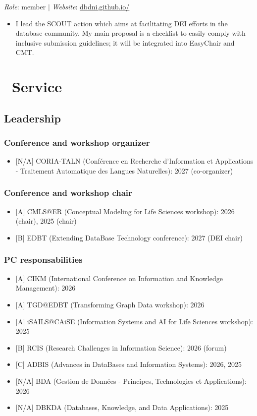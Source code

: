 \documentclass{article}
\begin{document}
\noindent\textit{Role}: member $|$ \textit{Website}: \href{https://dbdni.github.io/}{dbdni.github.io/}

\begin{itemize}
\item I lead the SCOUT action which aims at facilitating DEI efforts in the database community. My main proposal is a checklist to easily comply with inclusive submission guidelines; it will be integrated into EasyChair and CMT.
\end{itemize}
\section*{\faGroup\ Service}
\subsection*{Leadership}
\subsubsection*{Conference and workshop organizer}
\begin{itemize}
\item $[$N/A$]$ CORIA-TALN (Conférence en Recherche d'Information et Applications - Traitement Automatique des Langues Naturelles): 2027 (co-organizer)
\end{itemize}
\subsubsection*{Conference and workshop chair}
\begin{itemize}
\item $[$A$]$ CMLS@ER (Conceptual Modeling for Life Sciences workshop): 2026 (chair), 2025 (chair)
\item $[$B$]$ EDBT (Extending DataBase Technology conference): 2027 (DEI chair)
\end{itemize}
\subsubsection*{PC responsabilities}
\begin{itemize}
\item $[$A$]$ CIKM (International Conference on Information and Knowledge Management): 2026
\item $[$A$]$ TGD@EDBT (Transforming Graph Data workshop): 2026
\item $[$A$]$ iSAILS@CAiSE (Information Systems and AI for Life Sciences workshop): 2025
\item $[$B$]$ RCIS (Research Challenges in Information Science): 2026 (forum)
\item $[$C$]$ ADBIS (Advances in DataBases and Information Systems): 2026, 2025
\item $[$N/A$]$ BDA (Gestion de Données - Principes, Technologies et Applications): 2026
\item $[$N/A$]$ DBKDA (Databases, Knowledge, and Data Applications): 2025
\end{itemize}
\end{document}
